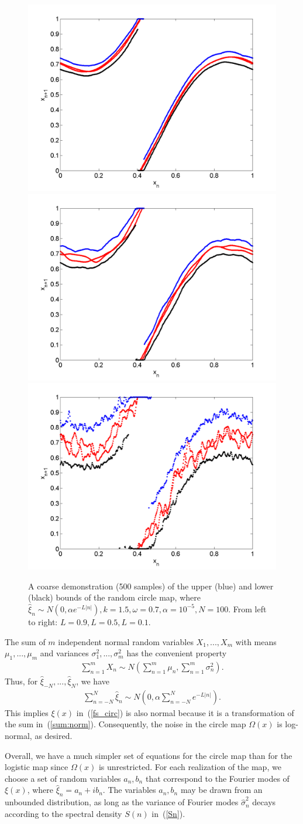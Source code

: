 \begin{figure}[htp]
\caption[Upper and lower bounds on the random circle map, with a normal
distribution, where $k=1.5,\omega=0.7$]{A coarse
  demonstration (500 samples) of the upper (blue) and lower (black)
  bounds of the random circle map, where $\hat{\xi}_n\sim N(0,\alpha
  e^{-L|n|}),k=1.5,\omega=0.7,\alpha = 10^{-5},N=100$. From left to
  right: $L=0.9,L=0.5,L=0.1$.}\label{fig:circ_n_envelope3}
\centering
\includegraphics[width=.3\textwidth]{figs/envelope_norm_500_k15_L09_w07.png}\hfill
\includegraphics[width=.3\textwidth]{figs/envelope_norm_500_k15_L05_w07.png}\hfill
\includegraphics[width=.3\textwidth]{figs/envelope_norm_500_k15_L01_w07.png}
\end{figure}

The sum of $m$ independent normal random variables
$X_1, ..., X_m$ with means $\mu_1, ..., \mu_m$ and variances
$\sigma_1^2, ..., \sigma_m^2$ has the convenient property
\begin{align*}
\sum_{n=1}^mX_n \sim N\left(\sum_{n=1}^m\mu_n, \sum_{n=1}^m\sigma_n^2\right).
\end{align*}
Thus, for $\hat{\xi}_{-N},...,\hat{\xi}_N$, we have
\begin{align}\label{sum:norm}
\sum_{n=-N}^N \hat{\xi}_n \sim N\left(0, \alpha\sum_{n=-N}^N e^{-L|n|}\right).
\end{align}
This implies $\xi(x)$ in~(\ref{fs_circ}) is also normal because it is
a transformation of the sum in~(\ref{sum:norm}). Consequently, the
noise in the circle map $\Omega(x)$ is log-normal, as
desired. 

Overall, we have a much simpler set of equations for the circle map
than for the logistic map since $\Omega(x)$ is unrestricted. For each
realization of the map, we choose a set of random variables $a_n, b_n$
that correspond to the Fourier modes of $\xi(x)$, where $\hat{\xi}_n =
a_n + ib_n$. The variables $a_n, b_n$ may be drawn from an unbounded
distribution, as long as the variance of Fourier modes
$\hat{\sigma}_n^2$ decays according to the spectral density $S(n)$ in~(\ref{Sn}). 